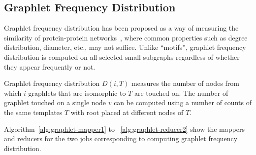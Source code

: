 \fi

\subsection{Graphlet Frequency Distribution}
\label{sec:graphlet}

Graphlet frequency distribution has been proposed as
a way of measuring the similarity of
protein-protein networks~\cite{przulj2007biological}, where common properties
such as degree distribution, diameter, etc., may not suffice.
Unlike ``motifs'', graphlet frequency distribution is computed on all
selected small subgraphs regardless of whether they appear frequently or not.

Graphlet frequency distribution $D(i,T)$ measures the number of nodes from
which $i$ graphlets that are isomorphic to $T$ are touched on. The number of
graphlet touched on a single node $v$ can be computed using a number of counts
of the same templates $T$ with root placed at different nodes of $T$. 

\iffalse

Algorithm~\ref{alg:graphlet-mapper1} to
~\ref{alg:graphlet-reducer2} show the mappers and reducers for the two jobs
corresponding to computing graphlet frequency distribution.

